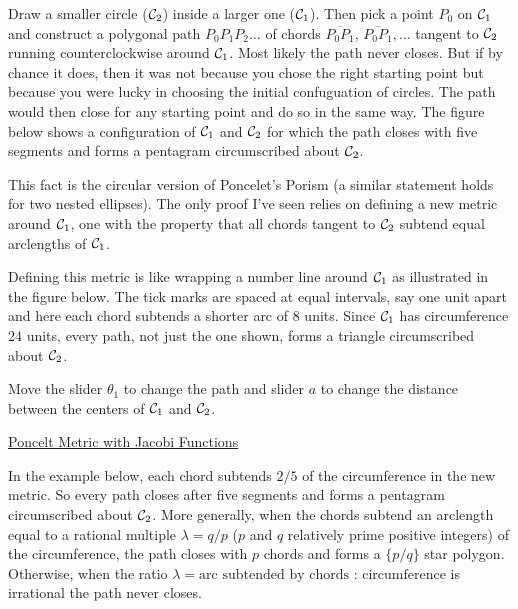 \documentclass{ximera}
\begin{document}
Draw a smaller circle (${\cal C}_2$) inside a larger one (${\cal C}_1$). Then pick a point $P_0$ on ${\cal C}_1$ and construct a polygonal path $P_0 P_1 P_2 \ldots$ of chords $\overline{P_0P_1}$, $\overline{P_0P_1}, \ldots$ tangent to ${\cal C}_2$ running counterclockwise around ${\cal C}_1$. Most likely the path never closes.  But if by chance it does, then it was not because you chose the right starting point but because you were lucky in choosing the initial confuguation of circles. The path would then close for any starting point and do so in the same way. The figure below shows a configuration of ${\cal C}_1$ and ${\cal C}_2$ for which the path closes with five segments and forms a pentagram circumscribed about ${\cal C}_2$.


This fact is the circular version of Poncelet's Porism (a similar statement holds for two nested ellipses). The only proof I've seen relies on defining a new metric around ${\cal C}_1$, one with the property that all chords tangent to ${\cal C}_2$ subtend equal arclengths of ${\cal C}_1$. 

Defining this metric is like wrapping a number line around ${\cal C}_1$ as illustrated in the figure below. The tick marks are spaced at equal intervals, say one unit apart and here each chord subtends a shorter arc of $8$ units. Since ${\cal C}_1$ has circumference $24$ units, every path, not just the one shown, forms a triangle circumscribed about ${\cal C}_2$.  

\begin{exploration}
Move the slider $\theta_1$ to change the path and slider $a$ to change the distance between the centers of ${\cal C}_1$ and ${\cal C}_2$.
 
\begin{onlineOnly}
    \begin{center}
\end{center}
\end{onlineOnly}

\href{https://www.desmos.com/calculator/wzctareiln}{Poncelt Metric with Jacobi Functions}

\end{exploration}

In the example below, each chord subtends $2/5$ of the circumference in the new metric. So every path closes after five segments and forms a pentagram circumscribed about ${\cal C}_2$. More generally, when the chords subtend an arclength equal to a rational multiple $\lambda = q/p$ ($p$ and $q$ relatively prime positive integers) of the circumference, the path closes with $p$ chords and forms a $\{p/q \}$ star polygon. Otherwise, when the ratio $\lambda = \text{arc subtended by chords : circumference}$ is irrational the path never closes.
\end{document}
